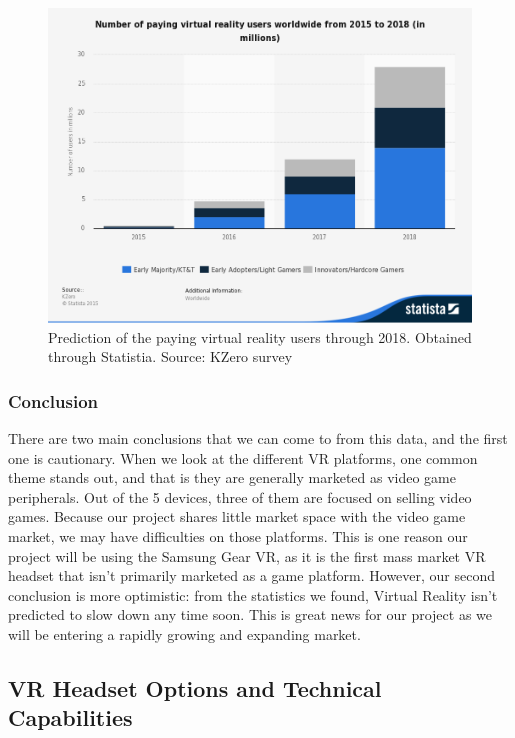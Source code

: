 \documentclass[a4paper,10pt]{article}
\begin{document}
\begin{figure}[H]
	\centerline{\includegraphics[scale = 0.23]{statPay.png}}
	\caption{Prediction of the paying virtual reality users through 2018.  Obtained through Statistia.  Source: KZero survey}
	\label{fig:moneyStats2}
\end{figure}
\subsubsection{Conclusion}

There are two main conclusions that we can come to from this data, and the first one is cautionary.  When we look at the different VR platforms, one common theme stands out, and that is they are generally marketed as video game peripherals.  Out of the 5 devices, three of them are focused on selling video games.  Because our project shares little market space with the video game market, we may have difficulties on those platforms.  This is one reason our project will be using the Samsung Gear VR, as it is the first mass market VR headset that isn't primarily marketed as a game platform.  However, our second conclusion is more optimistic: from the statistics we found, Virtual Reality isn't predicted to slow down any time soon.  This is great news for our project as we will be entering a rapidly growing and expanding market.

\pagebreak
\subsection{VR Headset Options and Technical Capabilities}
\label{section:headset}
\end{document}
